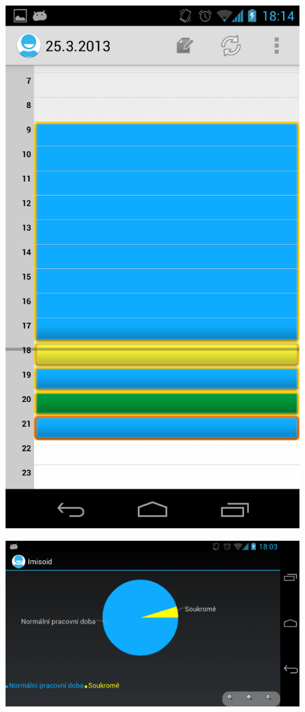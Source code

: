 \documentclass{diplomka}
\begin{document}
\begin{figure}[H]
  \centering
  \includegraphics[scale=0.3]{scr/time_doch.png}
  \label{}
\end{figure}

\begin{figure}[H]
  \centering
  \includegraphics[scale=0.3]{scr/graf_doch.png}
  \label{}
\end{figure}
\end{document}
